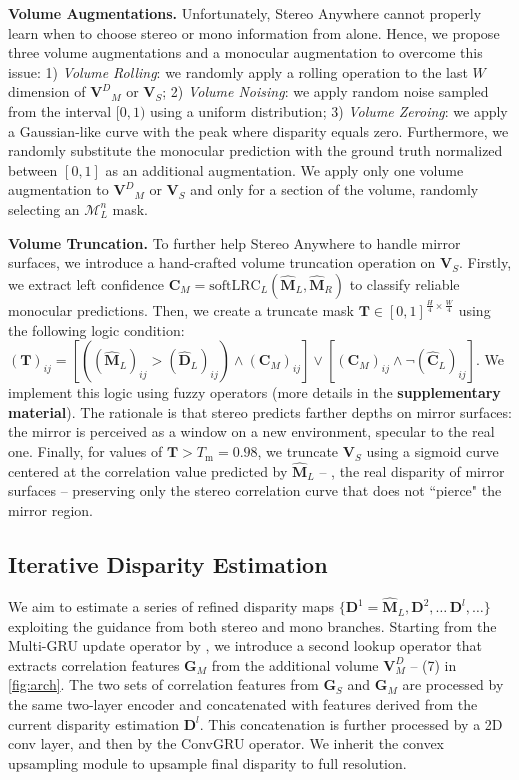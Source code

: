 \documentclass[10pt,twocolumn,letterpaper]{article}
\newcommand{\method}[0]{Stereo Anywhere\xspace}
\begin{document}
\textbf{Volume Augmentations.} Unfortunately, \method cannot properly learn when to choose stereo or mono information from \cite{mayer2016large} alone.
Hence, we propose three volume augmentations and a monocular augmentation to overcome this issue: 1) \textit{Volume Rolling}: we randomly apply a rolling operation to the last $W$ dimension of ${\mathbf{V}^D}_M$ or ${\mathbf{V}}_S$; 2) \textit{Volume Noising}: we apply random noise sampled from the interval $[0,1)$ using a uniform distribution; 3) \textit{Volume Zeroing}: we apply a Gaussian-like curve with the peak where disparity equals zero. Furthermore, we randomly substitute the monocular prediction with the ground truth normalized between $[0,1]$ as an additional augmentation.
We apply only one volume augmentation to ${\mathbf{V}^D}_M$ or ${\mathbf{V}}_S$ and only for a section of the volume, randomly selecting an $\mathcal{M}_L^n$ mask.

\textbf{Volume Truncation.} To further help \method to handle mirror surfaces, we introduce a hand-crafted volume truncation operation on ${\mathbf{V}}_S$. Firstly, we extract left confidence $\mathbf{C}_M=\text{softLRC}_L(\hat{\mathbf{M}}_L, \hat{\mathbf{M}}_R)$ to classify reliable monocular predictions. Then, we create a truncate mask $\mathbf{T} \in [0,1]^{\frac{H}{4} \times \frac{W}{4}}$ using the following logic condition: $(\mathbf{T})_{ij}=\left[\left((\hat{\mathbf{M}}_L)_{ij} >(\hat{\mathbf{D}}_L)_{ij}\right) \land (\mathbf{C}_M)_{ij} \right] \lor \left[ (\mathbf{C}_M)_{ij} \land \neg(\hat{\mathbf{C}}_L)_{ij} \right]$.
We implement this logic using fuzzy operators (more details in the \textbf{supplementary material}).
The rationale is that stereo predicts farther depths on mirror surfaces: the mirror is perceived as a window on a new environment, specular to the real one.
Finally, for values of $\mathbf{T}>T_\text{m}=0.98$, we truncate ${\mathbf{V}_S}$ using a sigmoid curve centered at the correlation value predicted by $\hat{\mathbf{M}}_L$ -- \ie, the real disparity of mirror surfaces -- preserving only the stereo correlation curve that does not ``pierce" the mirror region.

\subsection{Iterative Disparity Estimation}

We aim to estimate a series of refined disparity maps $\{\mathbf{D}^1=\hat{\mathbf{M}}_L, \mathbf{D}^2,\dots\,\mathbf{D}^l,\dots\}$ exploiting the guidance from both stereo and mono branches.
Starting from the Multi-GRU update operator by \cite{lipson2021raft}, we introduce a second lookup operator that extracts correlation features $\mathbf{G}_M$ from the additional volume $\mathbf{V}^D_M$ -- (7) in \cref{fig:arch}.
The two sets of correlation features from $\mathbf{G}_S$ and $\mathbf{G}_M$ are processed by the same two-layer encoder and concatenated with features derived from the current disparity estimation $\mathbf{D}^l$. This concatenation is further processed by a 2D conv layer, and then by the ConvGRU operator.
We inherit the convex upsampling module \cite{lipson2021raft} to upsample final disparity to full resolution.
\end{document}
